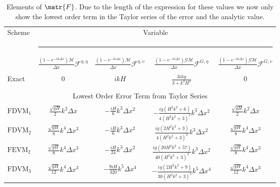 \begin{table}
	\centering
	\begin{adjustbox}{}
		\begin{tabular}{l c c c c}
			Scheme &\multicolumn{4}{c}{Variable}\\
			&  \multicolumn{4}{l}{\rule{0.95\textwidth}{0.4pt}} \\
			& $\frac{\left(1 - e^{-ik\Delta x}\right)\mathcal{M}}{\Delta x}\mathcal{F}^{\eta,\eta}$& $\frac{\left(1 - e^{-ik\Delta x}\right)\mathcal{M}}{\Delta x} \mathcal{F}^{\eta,\upsilon}$& $ \frac{\left(1 - e^{-ik\Delta x}\right)\mathcal{G}\mathcal{M}}{\Delta x} \mathcal{F}^{G,\eta}$ & $\frac{\left(1 - e^{-ik\Delta x}\right)\mathcal{G}\mathcal{M}}{\Delta x} \mathcal{F}^{G,\upsilon}$ \\
			\hline \\
			Exact &  $0$& $ikH$ & $\frac{3ikg}{3 + k^2H^2}$ & $0$\\
			\\ \hline \multicolumn{5}{c}{Lowest Order Error Term from Taylor Series} \\ \hline\\
			$\text{FDVM}_1$ & $\frac{\sqrt{gH}}{2}k^2 \Delta x$& $ -\frac{iH}{6} k^3 \Delta x^2$& $-\frac{ig\left(H^2k^2 + 6\right)}{4\left(H^2k^2 +3\right)^2} k^3 \Delta x^2$&$\frac{\sqrt{gH}}{2}k^2 \Delta x$ \\ [5mm]
			$\text{FDVM}_2$ & $\frac{\sqrt{gH}}{8}k^4 \Delta x^3$& $ -\frac{iH}{6} k^3 \Delta x^2$& $\frac{ig\left(2H^2k^2 + 3\right)}{4\left(H^2k^2 +3\right)^2} k^3 \Delta x^2$&$\frac{\sqrt{gH}}{8}k^4 \Delta x^3$ \\ [5mm]
			$\text{FEVM}_2$ & $\frac{\sqrt{gH}}{8}k^4 \Delta x^3$& $ -\frac{iH}{24} k^3 \Delta x^2$& $\frac{ig\left(20H^2k^2 + 57 \right)}{40\left(H^2k^2 +3\right)^2} k^3 \Delta x^2$&$\frac{\sqrt{gH}}{8}k^4 \Delta x^3$ \\ [5mm]
			$\text{FDVM}_3$ & $\frac{\sqrt{gH}}{12}k^4 \Delta x^3$& $ -\frac{9iH}{320} k^5 \Delta x^4$& $-\frac{ig\left(2H^2k^2 + 9\right)}{30\left(H^2k^2 +3\right)^2}k^5 \Delta x^4$&$\frac{\sqrt{gH}}{12}k^4 \Delta x^3$ \\
		\end{tabular}
	\end{adjustbox}
	\caption{Elements of $\matr{F}$. Due to the length of the expression for these values we now only show the lowest order term in the Taylor series of the error and the analytic value.}
	\label{tab:Ffactor}
\end{table}




